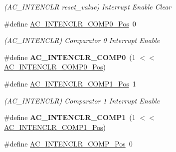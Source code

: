 \begin{DoxyCompactItemize}
\begin{DoxyCompactList}\small\item\em (A\+C\+\_\+\+I\+N\+T\+E\+N\+C\+L\+R reset\+\_\+value) Interrupt Enable Clear \end{DoxyCompactList}\item 
\hypertarget{group___s_a_m_l21___a_c_ga4168c6a55362a465c232cdfae855edb6}{}\#define \hyperlink{group___s_a_m_l21___a_c_ga4168c6a55362a465c232cdfae855edb6}{A\+C\+\_\+\+I\+N\+T\+E\+N\+C\+L\+R\+\_\+\+C\+O\+M\+P0\+\_\+\+Pos}~0\label{group___s_a_m_l21___a_c_ga4168c6a55362a465c232cdfae855edb6}

\begin{DoxyCompactList}\small\item\em (A\+C\+\_\+\+I\+N\+T\+E\+N\+C\+L\+R) Comparator 0 Interrupt Enable \end{DoxyCompactList}\item 
\hypertarget{group___s_a_m_l21___a_c_gad35d3243f99f27892051f17428b96fb5}{}\#define {\bfseries A\+C\+\_\+\+I\+N\+T\+E\+N\+C\+L\+R\+\_\+\+C\+O\+M\+P0}~(1 $<$$<$ \hyperlink{group___s_a_m_l21___a_c_ga4168c6a55362a465c232cdfae855edb6}{A\+C\+\_\+\+I\+N\+T\+E\+N\+C\+L\+R\+\_\+\+C\+O\+M\+P0\+\_\+\+Pos})\label{group___s_a_m_l21___a_c_gad35d3243f99f27892051f17428b96fb5}

\item 
\hypertarget{group___s_a_m_l21___a_c_gae1f585c9c3dfbbcbb14748de3d028334}{}\#define \hyperlink{group___s_a_m_l21___a_c_gae1f585c9c3dfbbcbb14748de3d028334}{A\+C\+\_\+\+I\+N\+T\+E\+N\+C\+L\+R\+\_\+\+C\+O\+M\+P1\+\_\+\+Pos}~1\label{group___s_a_m_l21___a_c_gae1f585c9c3dfbbcbb14748de3d028334}

\begin{DoxyCompactList}\small\item\em (A\+C\+\_\+\+I\+N\+T\+E\+N\+C\+L\+R) Comparator 1 Interrupt Enable \end{DoxyCompactList}\item 
\hypertarget{group___s_a_m_l21___a_c_ga3c78ac5c7106e38172929577f836bc3e}{}\#define {\bfseries A\+C\+\_\+\+I\+N\+T\+E\+N\+C\+L\+R\+\_\+\+C\+O\+M\+P1}~(1 $<$$<$ \hyperlink{group___s_a_m_l21___a_c_gae1f585c9c3dfbbcbb14748de3d028334}{A\+C\+\_\+\+I\+N\+T\+E\+N\+C\+L\+R\+\_\+\+C\+O\+M\+P1\+\_\+\+Pos})\label{group___s_a_m_l21___a_c_ga3c78ac5c7106e38172929577f836bc3e}

\item 
\hypertarget{group___s_a_m_l21___a_c_ga444b400feaaa1e25e0626635cfdf1144}{}\#define \hyperlink{group___s_a_m_l21___a_c_ga444b400feaaa1e25e0626635cfdf1144}{A\+C\+\_\+\+I\+N\+T\+E\+N\+C\+L\+R\+\_\+\+C\+O\+M\+P\+\_\+\+Pos}~0\label{group___s_a_m_l21___a_c_ga444b400feaaa1e25e0626635cfdf1144}


\end{DoxyCompactItemize}
